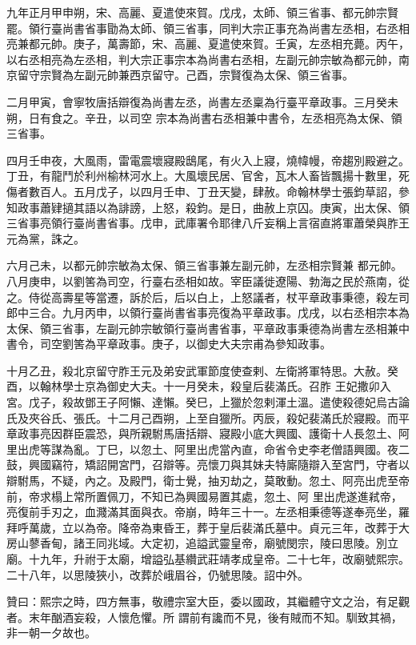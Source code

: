\begin{pinyinscope}
 九年正月甲申朔，宋、高麗、夏遣使來賀。戊戌，太師、領三省事、都元帥宗賢罷。領行臺尚書省事勖為太師、領三省事，同判大宗正事充為尚書左丞相，右丞相亮兼都元帥。庚子，萬壽節，宋、高麗、夏遣使來賀。壬寅，左丞相充薨。丙午，以右丞相亮為左丞相，判大宗正事宗本為尚書右丞相，左副元帥宗敏為都元帥，南京留守宗賢為左副元帥兼西京留守。己酉，宗賢復為太保、領三省事。



 二月甲寅，會寧牧唐括辯復為尚書左丞，尚書左丞稟為行臺平章政事。三月癸未朔，日有食之。辛丑，以司空
 宗本為尚書右丞相兼中書令，左丞相亮為太保、領三省事。



 四月壬申夜，大風雨，雷電震壞寢殿鴟尾，有火入上寢，燒幃幔，帝趨別殿避之。丁丑，有龍鬥於利州榆林河水上。大風壞民居、官舍，瓦木人畜皆飄揚十數里，死傷者數百人。五月戊子，以四月壬申、丁丑天變，肆赦。命翰林學士張鈞草詔，參知政事蕭肄擿其語以為誹謗，上怒，殺鈞。是日，曲赦上京囚。庚寅，出太保、領三省事亮領行臺尚書省事。戊申，武庫署令耶律八斤妄稱上言宿直將軍蕭榮與胙王元為黨，誅之。



 六月己未，以都元帥宗敏為太保、領三省事兼左副元帥，左丞相宗賢兼
 都元帥。八月庚申，以劉筈為司空，行臺右丞相如故。宰臣議徙遼陽、勃海之民於燕南，從之。侍從高壽星等當遷，訴於后，后以白上，上怒議者，杖平章政事秉德，殺左司郎中三合。九月丙申，以領行臺尚書省事亮復為平章政事。戊戌，以右丞相宗本為太保、領三省事，左副元帥宗敏領行臺尚書省事，平章政事秉德為尚書左丞相兼中書令，司空劉筈為平章政事。庚子，以御史大夫宗甫為參知政事。



 十月乙丑，殺北京留守胙王元及弟安武軍節度使查剌、左衛將軍特思。大赦。癸酉，以翰林學士京為御史大夫。十一月癸未，殺皇后裴滿氏。召胙
 王妃撒卯入宮。戊子，殺故鄧王子阿懶、達懶。癸巳，上獵於忽剌渾土溫。遣使殺德妃烏古論氏及夾谷氏、張氏。十二月己酉朔，上至自獵所。丙辰，殺妃裴滿氏於寢殿。而平章政事亮因群臣震恐，與所親駙馬唐括辯、寢殿小底大興國、護衛十人長忽土、阿里出虎等謀為亂。丁巳，以忽土、阿里出虎當內直，命省令史李老僧語興國。夜二鼓，興國竊符，矯詔開宮門，召辯等。亮懷刀與其妹夫特廝隨辯入至宮門，守者以辯駙馬，不疑，內之。及殿門，衛士覺，抽刃劫之，莫敢動。忽土、阿亮出虎至帝前，帝求榻上常所置佩刀，不知已為興國易置其處，忽土、阿
 里出虎遂進弒帝，亮復前手刃之，血濺滿其面與衣。帝崩，時年三十一。左丞相秉德等遂奉亮坐，羅拜呼萬歲，立以為帝。降帝為東昏王，葬于皇后裴滿氏墓中。貞元三年，改葬于大房山蓼香甸，諸王同兆域。大定初，追謚武靈皇帝，廟號閔宗，陵曰思陵。別立廟。十九年，升祔于太廟，增謚弘基纘武莊靖孝成皇帝。二十七年，改廟號熙宗。二十八年，以思陵狹小，改葬於峨眉谷，仍號思陵。詔中外。



 贊曰：熙宗之時，四方無事，敬禮宗室大臣，委以國政，其繼體守文之治，有足觀者。末年酗酒妄殺，人懷危懼。所
 謂前有讒而不見，後有賊而不知。馴致其禍，非一朝一夕故也。



\end{pinyinscope}